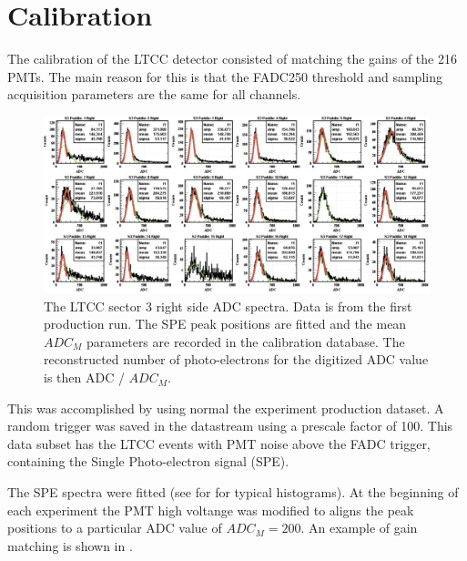 \section{Calibration}

The calibration of the LTCC detector consisted of matching the gains of the 216 PMTs.
The main reason for this is that the FADC250 threshold and sampling acquisition parameters are the same for all channels.

\begin{figure}[ht]
	\centering
	\includegraphics[width=1.99\columnwidth,keepaspectratio]{img/spe.png}
	\caption{The LTCC sector 3 right side ADC spectra. Data is from the first production run. The SPE peak positions are fitted and the mean $ADC_M$
            parameters are recorded in the calibration database. The reconstructed number of photo-electrons for the digitized ADC value is then ADC / $ADC_M$.}
	\label{fig:speCalibration}
\end{figure}

This was accomplished by using normal the experiment production dataset.
A random trigger was saved in the datastream using a prescale factor of 100.
This data subset has the LTCC events with PMT noise above the FADC trigger, containing the Single Photo-electron signal (SPE).

The SPE spectra were fitted (see for  for typical histograms).
At the beginning of each experiment the PMT high voltange was modified to aligns the peak positions
to a particular ADC value of $ADC_M = 200$. An example of gain matching is shown in .


